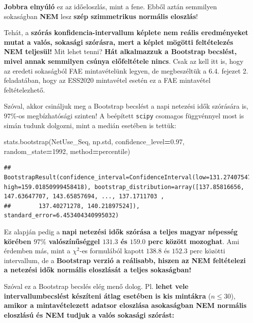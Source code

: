 \documentclass[
]{book}
\newenvironment{Shaded}{\begin{snugshade}}{\end{snugshade}}
\newcommand{\DecValTok}[1]{\textcolor[rgb]{0.00,0.00,0.81}{#1}}
\newcommand{\FloatTok}[1]{\textcolor[rgb]{0.00,0.00,0.81}{#1}}
\newcommand{\NormalTok}[1]{#1}
\newcommand{\OperatorTok}[1]{\textcolor[rgb]{0.81,0.36,0.00}{\textbf{#1}}}
\newcommand{\StringTok}[1]{\textcolor[rgb]{0.31,0.60,0.02}{#1}}
\begin{document}
\textbf{Jobbra elnyúló} ez az időeloszlás, mint a fene. Ebből aztán semmilyen sokaságban \textbf{NEM} lesz \textbf{szép szimmetrikus normális eloszlás}!

Tehát, a \textbf{szórás konfidencia-intervallum képlete nem reális eredményeket mutat a valós, sokasági szórásra, mert a képlet mögötti feltételezés NEM teljesül!}
Mit lehet tenni? \textbf{Hát alkalmazzuk a Bootstrap becslést, mivel annak semmilyen csúnya előfeltétele nincs}. Csak az kell itt is, hogy az eredeti sokaságból FAE mintavételünk legyen, de megbeszéltük a 6.4. fejezet 2. feladatában, hogy az ESS2020 mintavétel esetén ez a FAE mintavétel feltételezhető.

Szóval, akkor csináljuk meg a Bootstrap becslést a napi netezési idők szórására is, \(97\%\)-os megbízhatósági szinten! A beépített \texttt{scipy} csomagos függvénnyel most is simán tudunk dolgozni, mint a medián esetében is tettük:

\begin{Shaded}
\begin{Highlighting}[]
\NormalTok{stats.bootstrap(NetUse\_Seq, np.std, confidence\_level}\OperatorTok{=}\FloatTok{0.97}\NormalTok{,}
\NormalTok{                         random\_state}\OperatorTok{=}\DecValTok{1992}\NormalTok{, method}\OperatorTok{=}\StringTok{\textquotesingle{}percentile\textquotesingle{}}\NormalTok{)}
\end{Highlighting}
\end{Shaded}

\begin{verbatim}
## BootstrapResult(confidence_interval=ConfidenceInterval(low=131.27407547315042, high=159.01850999458418), bootstrap_distribution=array([137.85816656, 147.63647707, 143.65857694, ..., 137.1711703 ,
##        137.40271278, 140.21897524]), standard_error=6.453404340995032)
\end{verbatim}

Ez alapján pedig a \textbf{napi netezési idők szórása a teljes magyar népesség körében \(97\%\) valószínűséggel \(131.3\) és \(159.0\) perc között mozoghat}. Ami érdemben más, mint a \(\chi^2\)-es formulából kapott \(138.8\) és \(152.3\) perc közötti intervallum, de a \textbf{Bootstrap verzió a reálisabb, hiszen az NEM feltételezi a netezési idők normális eloszlását a teljes sokaságban!}

Szóval ez a Bootstrap becslés elég menő dolog. Pl. \textbf{lehet vele intervallumbecslést készíteni átlag esetében is kis mintákra} (\(n\leq 30\)), \textbf{amikor a mintavételezett adatsor eloszlása asokaságban NEM normális eloszlású és NEM tudjuk a valós sokasági szórást:}
\end{document}
